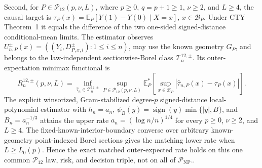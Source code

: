 \documentclass{article}
\begin{document}
Second, for \(P\in\mathcal P_{12}(p,\nu,L)\), where \(p\geq0\), \(q=p+1\geq1\), \(\nu\geq2\), and \(L\geq4\), the causal target is \(\tau_P(x)=\mathbb E_P[Y(1)-Y(0)\mid X=x]\), \(x\in\mathcal B_P\).  Under CTY Theorem~1 it equals the difference of the two one-sided signed-distance conditional-mean limits.  The estimator observes \(U^{\pm}_{n,P}(x)=((Y_i,D^{\pm}_{P,x,i}):1\leq i\leq n)\), may use the known geometry \(G_P\), and belongs to the law-independent sectionwise-Borel class \(\mathcal T_n^{12,\pm}\).  Its outer-expectation minimax functional is
\[
 R_n^{12,\pm}(p,\nu,L)=\inf_{\widehat\tau_n\in\mathcal T_n^{12,\pm}}
 \sup_{P\in\mathcal P_{12}(p,\nu,L)}
 \mathbb E_P^*\!\left[\sup_{x\in\mathcal B_P}|\widehat\tau_{n,P}(x)-\tau_P(x)|\right].
\]
The explicit winsorized, Gram-stabilized degree-\(p\) signed-distance local-polynomial estimator with \(h_n=a_n\), \(\psi_B(y)=\operatorname{sign}(y)\min\{|y|,B\}\), and \(B_n=a_n^{-1/3}\) attains the upper rate \(a_n=(\log n/n)^{1/4}\) for every \(p\geq0\), \(\nu\geq2\), and \(L\geq4\).  The fixed-known-interior-boundary converse over arbitrary known-geometry point-indexed Borel sections gives the matching lower rate when \(L\geq L_0(p)\).  Hence the exact matched outer-expected rate holds on this one common \(\mathcal P_{12}\) law, risk, and decision triple, not on all of \(\mathcal P_{\mathrm{NP}}\)..
\end{document}
